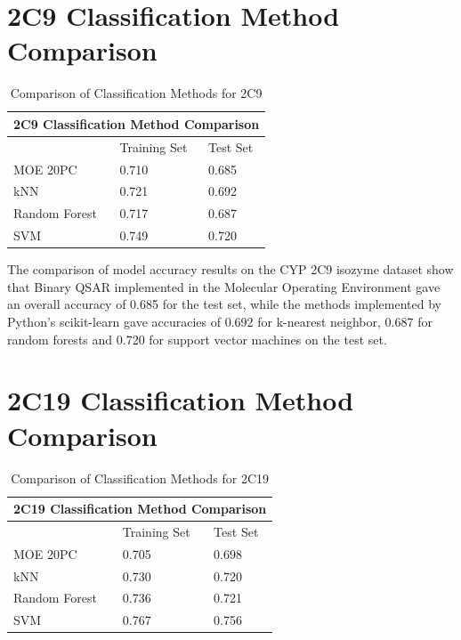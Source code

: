 \section{2C9 Classification Method Comparison}

\begin{table}[H]
\caption{Comparison of Classification Methods for 2C9}
\centering
\begin{tabular}{|l|l|l|}
\hline
\multicolumn{3}{|c|}{2C9 Classification Method Comparison} \\ \hline
          & Training Set & Test Set \\ \hline
MOE 20PC  & 0.710        & 0.685    \\ \hline
kNN       & 0.721        & 0.692    \\ \hline
Random Forest & 0.717    & 0.687    \\ \hline
SVM       & 0.749        & 0.720    \\ \hline
\end{tabular}
\end{table}

The comparison of model accuracy results on the CYP 2C9 isozyme dataset show that Binary QSAR implemented in the Molecular Operating Environment gave an overall accuracy of 0.685 for the test set, while the methods implemented by Python's scikit-learn gave accuracies of 0.692 for k-nearest neighbor, 0.687 for random forests and 0.720 for support vector machines on the test set.

\section{2C19 Classification Method Comparison}

\begin{table}[H]
\caption{Comparison of Classification Methods for 2C19}
\centering
\begin{tabular}{|l|l|l|}
\hline
\multicolumn{3}{|c|}{2C19 Classification Method Comparison} \\ \hline
          & Training Set & Test Set \\ \hline
MOE 20PC  & 0.705        & 0.698    \\ \hline
kNN       & 0.730        & 0.720    \\ \hline
Random Forest & 0.736    & 0.721    \\ \hline
SVM       & 0.767        & 0.756    \\ \hline
\end{tabular}
\end{table}

